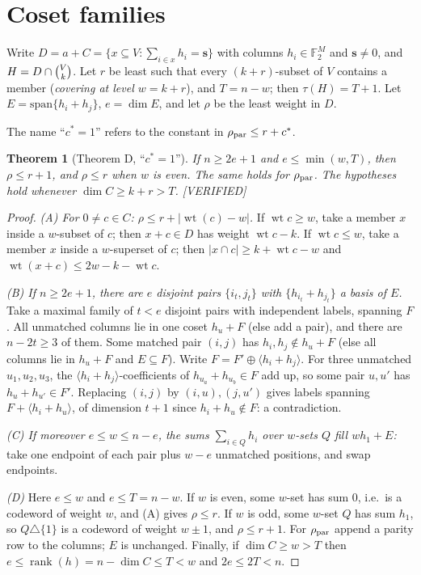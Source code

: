 \documentclass[11pt]{article}
\newtheorem{theorem}{Theorem}[section]
\theoremstyle{definition}
\newcommand{\st}[1]{\textsf{\small[#1]}}
\newcommand{\F}{\mathbb{F}_2}
\newcommand{\wt}{\operatorname{wt}}
\newcommand{\binomV}[1]{\tbinom{V}{#1}}
\begin{document}
\section{Coset families}\label{sec:coset}

Write $D=a+C=\{x\subseteq V:\sum_{i\in x}h_i=\mathbf s\}$ with columns $h_i\in\F^M$ and $\mathbf s\ne0$, and
$H=D\cap\binomV k$. Let $r$ be least such that every $(k+r)$-subset of $V$ contains a member (\emph{covering at level
$w=k+r$}), and $T=n-w$; then $\tau(H)=T+1$. Let $E=\mathrm{span}\{h_i+h_j\}$, $e=\dim E$, and let $\rho$ be the least
weight in $D$.

The name ``$c^*=1$'' refers to the constant in $\rho_{\rm par}\le r+c^*$.
\begin{theorem}[Theorem D, ``$c^*=1$'']\label{thm:D}
If $n\ge2e+1$ and $e\le\min(w,T)$, then $\rho\le r+1$, and $\rho\le r$ when $w$ is even. The same holds for
$\rho_{\rm par}$. The hypotheses hold whenever $\dim C\ge k+r>T$. \st{VERIFIED}
\end{theorem}
\begin{proof}
\emph{(A) For $0\ne c\in C$: $\rho\le r+|\wt(c)-w|$.} If $\wt c\ge w$, take a member $x$ inside a $w$-subset of $c$;
then $x+c\in D$ has weight $\wt c-k$. If $\wt c\le w$, take a member $x$ inside a $w$-superset of $c$; then
$|x\cap c|\ge k+\wt c-w$ and $\wt(x+c)\le2w-k-\wt c$.

\emph{(B) If $n\ge2e+1$, there are $e$ disjoint pairs $\{i_t,j_t\}$ with $\{h_{i_t}+h_{j_t}\}$ a basis of $E$.} Take a
maximal family of $t<e$ disjoint pairs with independent labels, spanning $F$. All unmatched columns lie in one coset
$h_u+F$ (else add a pair), and there are $n-2t\ge3$ of them. Some matched pair $(i,j)$ has $h_i,h_j\notin h_u+F$ (else
all columns lie in $h_u+F$ and $E\subseteq F$). Write $F=F'\oplus\langle h_i+h_j\rangle$. For three unmatched $u_1,u_2,u_3$,
the $\langle h_i+h_j\rangle$-coefficients of $h_{u_a}+h_{u_b}\in F$ add up, so some pair $u,u'$ has $h_u+h_{u'}\in F'$.
Replacing $(i,j)$ by $(i,u),(j,u')$ gives labels spanning $F+\langle h_i+h_u\rangle$, of dimension $t+1$ since
$h_i+h_u\notin F$: a contradiction.

\emph{(C) If moreover $e\le w\le n-e$, the sums $\sum_{i\in Q}h_i$ over $w$-sets $Q$ fill $wh_1+E$:} take one endpoint
of each pair plus $w-e$ unmatched positions, and swap endpoints.

\emph{(D)} Here $e\le w$ and $e\le T=n-w$. If $w$ is even, some $w$-set has sum $0$, i.e.\ is a codeword of weight
$w$, and (A) gives $\rho\le r$. If $w$ is odd, some $w$-set $Q$ has sum $h_1$, so $Q\triangle\{1\}$ is a codeword of
weight $w\pm1$, and $\rho\le r+1$. For $\rho_{\rm par}$ append a parity row to the columns; $E$ is unchanged. Finally,
if $\dim C\ge w>T$ then $e\le\operatorname{rank}(h)=n-\dim C\le T<w$ and $2e\le2T<n$.
\end{proof}
\end{document}
